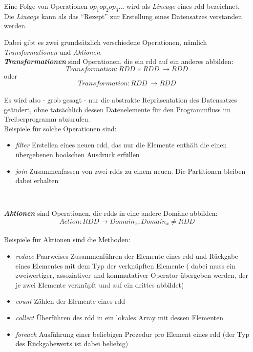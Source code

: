 Eine Folge von Operationen $op_1op_2op_3...$ wird als \textit{Lineage} eines \gls{rdd} bezeichnet. Die \textit{Lineage} kann als das "`Rezept"' zur Erstellung eines Datensatzes verstanden werden.

Dabei gibt es zwei grundsätzlich verschiedene Operationen, nämlich \textit{Transformationen} und \textit{Aktionen}.\\

\textbf{\textit{Transformationen}} sind Operationen, die ein \gls{rdd} auf ein anderes abbilden:\\
\[Transformation: RDD \times RDD\ \longrightarrow RDD\]
oder
\[Transformation: RDD\ \longrightarrow RDD\]
\\
Es wird also - grob gesagt - nur die abstrakte Repräsentation des Datensatzes geändert, ohne tatsächlich dessen Datenelemente für den Programmfluss im Treiberprogramm abzurufen.\\
Beispiele für solche Operationen sind:
\begin{itemize}
	\item \textit{filter} \newline Erstellen eines neuen \gls{rdd}, das nur die Elemente enthält die einen übergebenen boolschen Ausdruck erfüllen
	\item \textit{join} \newline Zusammenfassen von zwei \glspl{rdd} zu einem neuen. Die Partitionen bleiben dabei erhalten
\end{itemize}\\
\newline

\textbf{\textit{Aktionen}} sind Operationen, die \glspl{rdd} in eine andere Domäne abbilden:\\
\[Action: RDD \longrightarrow Domain_x, Domain_x \neq RDD\]
\\
Beispiele für Aktionen sind die Methoden:
\begin{itemize}
	\item \textit{reduce} \newline Paarweises Zusammenführen der Elemente eines \gls{rdd} und Rückgabe eines Elementes mit dem Typ der verknüpften Elemente ( dabei muss ein zweiwertiger, assoziativer und kommutativer Operator übergeben werden, der je zwei Elemente verknüpft und auf ein drittes abbildet)
	\item \textit{count} \newline Zählen der Elemente eines \gls{rdd}
	\item \textit{collect} \newline Überführen des \gls{rdd} in ein lokales Array mit dessen Elementen
	\item \textit{foreach} \newline Ausführung einer beliebigen Prozedur pro Element eines \gls{rdd} (der Typ des Rückgabewerts ist dabei beliebig)
\end{itemize}\\

